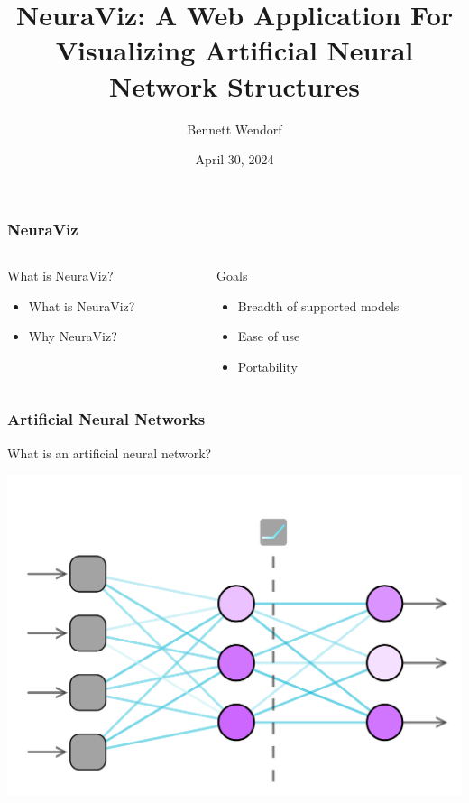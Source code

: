 \documentclass{beamer}
\title{NeuraViz: A Web Application For Visualizing Artificial Neural Network Structures}
\author{Bennett Wendorf}
\institute{University of Wisconsin - La Crosse}
\date{April 30, 2024}
\begin{document}
 
\frame{\titlepage}


\begin{frame}
    \frametitle{NeuraViz}
    \begin{columns}
        \begin{column}{0.5\textwidth}
            \begin{block}{What is NeuraViz?}
                \begin{itemize}
                    \item What is NeuraViz? \pause
                    \item Why NeuraViz?
                \end{itemize}
            \end{block}
        \end{column}
        \pause
        \begin{column}{0.5\textwidth}
            \begin{block}{Goals}
                \begin{itemize}
                    \item Breadth of supported models \pause
                    \item Ease of use \pause
                    \item Portability
                \end{itemize}
            \end{block}
        \end{column}
    \end{columns}
\end{frame}

\begin{frame}
    \frametitle{Artificial Neural Networks}
    \begin{block}{}
        What is an artificial neural network?
    \end{block}
    \pause
    \centering
    \includegraphics[scale=0.18]{../01_introduction/res/neural_network.png}
\end{frame}
    
\end{document}
